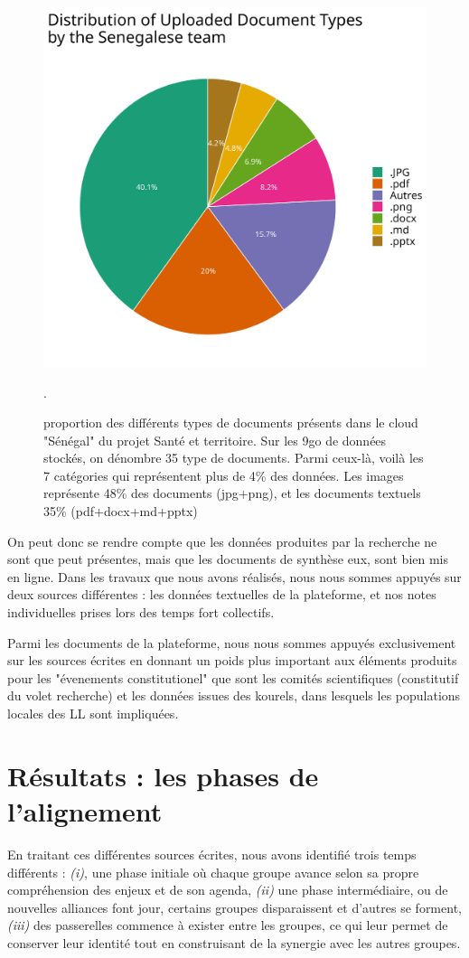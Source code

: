\documentclass{article}
\begin{document}
\begin{figure}
    \centering
    \includegraphics[width=0.6\linewidth]{img/doc_proportion.png}
    \caption{proportion des différents types de documents présents dans le cloud "Sénégal" du projet Santé et territoire. Sur les 9go de données stockés, on dénombre 35 type de documents. Parmi ceux-là, voilà les 7 catégories qui représentent plus de 4\% des données. Les images représente 48\% des documents (jpg+png), et les documents textuels 35\% (pdf+docx+md+pptx)}.
    \label{fig:filetype}
\end{figure}

On peut donc se rendre compte que les données produites par la recherche ne sont que peut présentes, mais que les documents de synthèse eux, sont bien mis en ligne. Dans les travaux que nous avons réalisés, nous nous sommes appuyés sur deux sources différentes : les données textuelles de la plateforme, et nos notes individuelles prises lors des temps fort collectifs. 

Parmi les documents de la plateforme, nous nous sommes appuyés exclusivement sur les sources écrites en donnant un poids plus important aux éléments produits pour les "évenements constitutionel" \textcite{jasanoff_constitutional_2011} que sont les comités scientifiques (constitutif du volet recherche) et les données issues des kourels, dans lesquels les populations locales des LL sont impliquées.

\section{Résultats : les phases de l'alignement}
En traitant ces différentes sources écrites, nous avons identifié trois temps différents : \textit{(i)}, une phase initiale où chaque groupe avance selon sa propre compréhension des enjeux et de son agenda, \textit{(ii)} une phase intermédiaire, ou de nouvelles alliances font jour, certains groupes disparaissent et d'autres se forment, \textit{(iii)} des passerelles commence à exister entre les groupes, ce qui leur permet de conserver leur identité tout en construisant de la synergie avec les autres groupes.
\end{document}
